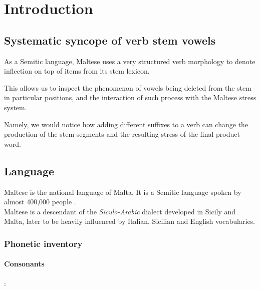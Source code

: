 \documentclass[11pt,draft]{article}
\begin{document}
\maketitle


\section{Introduction}

\subsection{Systematic syncope of verb stem vowels}

As a Semitic language, Maltese uses a very structured verb morphology to denote inflection on top of items from its stem lexicon.

This allows us to inspect the phenomenon of vowels being deleted from the stem in particular positions, and the interaction of such process with the Maltese stress system.

Namely, we would notice how adding different suffixes to a verb can change the production of the stem segments and the resulting stress of the final product word.

\subsection{Language}
Maltese is the national language of Malta. It is a Semitic language spoken by almost 400,000 people \cite{borg1997}.\\
Maltese is a descendant of the \emph{Siculo-Arabic} dialect developed in Sicily and Malta, later to be heavily influenced by Italian, Sicilian and English vocabularies.

\subsubsection{Phonetic inventory}

\paragraph{Consonants}
:

\end{document}
